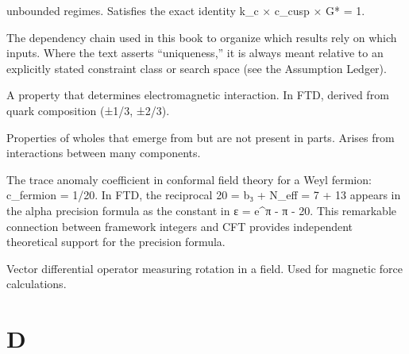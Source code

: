 \documentclass[
  11pt,
  letterpaper,
  twoside,
  openany]{book}
\makeatletter
\let\orig@section\section
\renewcommand{\section}{\needspace{8\baselineskip}\orig@section}
\makeatother
\begin{document}
\begin{description}
unbounded regimes. Satisfies the exact identity k\_c × c\_cusp × G* = 1.
\item[\textbf{Chain of Necessity}]
The dependency chain used in this book to organize which results rely on
which inputs. Where the text asserts ``uniqueness,'' it is always meant
relative to an explicitly stated constraint class or search space (see
the Assumption Ledger).
\item[\textbf{Charge}]
A property that determines electromagnetic interaction. In FTD, derived
from quark composition (±1/3, ±2/3).
\item[\textbf{Complexity}]
Properties of wholes that emerge from but are not present in parts.
Arises from interactions between many components.
\item[\textbf{Conformal Anomaly (c\_fermion)}]
The trace anomaly coefficient in conformal field theory for a Weyl
fermion: c\_fermion = 1/20. In FTD, the reciprocal 20 = b₃ + N\_eff = 7
+ 13 appears in the alpha precision formula as the constant in ε =
e\^{}π - π - 20. This remarkable connection between framework integers
and CFT provides independent theoretical support for the precision
formula.
\item[\textbf{Curl}]
Vector differential operator measuring rotation in a field. Used for
magnetic force calculations.
\end{description}

\section{D}\label{d}
\end{document}
